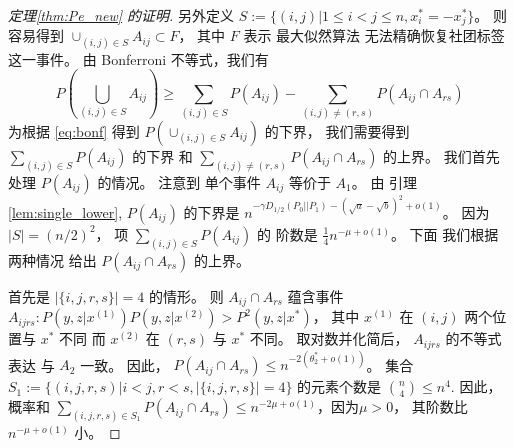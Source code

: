 \begin{proof}[定理\ref{thm:Pe_new} 的证明]
另外定义 $S:=\{(i,j)| 1\leq i < j\leq n,
x_i^*=-x_j^*
\}$。
则容易得到 $\cup_{(i,j) \in S} A_{ij} \subset F$，
其中 $F$ 表示 最大似然算法 无法精确恢复社团标签
这一事件。
由 Bonferroni 不等式，我们有
\begin{equation}\label{eq:bonf}
	P(\bigcup_{(i,j)\in S} A_{ij}) \geq
	\sum_{(i,j)\in S} P(A_{ij})
	- \sum_{(i,j) \neq (r,s)} P(A_{ij} \cap A_{rs})		
\end{equation}
为根据 \eqref{eq:bonf}
得到
$P(\cup_{(i,j)\in S} A_{ij})$
的下界，
我们需要得到 $\sum_{(i,j)\in S} P(A_{ij})$
的下界 和
$\sum_{(i,j) \neq (r,s)} P(A_{ij} \cap A_{rs})$
的上界。
我们首先 处理 $P(A_{ij})$ 的情况。
注意到 单个事件 $A_{ij}$
等价于 $A_1$。
由 引理\ref{lem:single_lower},
$P(A_{ij})$ 的下界是
$n^{-\gamma D_{1/2}(P_0 || P_1)-(\sqrt{a} - \sqrt{b})^2 +o(1)}$。
因为
$|S|=(n/2)^2$，
项 $\sum_{(i,j) \in S} P(A_{ij})$ 的 阶数是 
$\frac{1}{4}n^{-\mu+o(1)}$。
下面 我们根据两种情况 给出 $P(A_{ij} \cap A_{rs})$ 的上界。

首先是  $|\{i,j,r,s\}|=4$
的情形。 则 $A_{ij} \cap A_{rs}$ 蕴含事件
$A_{ijrs}: P(y,z|x^{(1)})P(y,z|x^{(2)}) > P^2(y,z|x^*)$，
其中 $x^{(1)}$ 在 $(i,j)$ 两个位置与 $x^*$ 不同
而 $x^{(2)}$ 在 $(r,s)$ 与 $x^*$
不同。
取对数并化简后，
$A_{ijrs}$ 的不等式表达
与 $A_2$ 一致。
因此， $P(A_{ij} \cap A_{rs}) \leq n^{-2(\theta^*_2 + o(1))} $。
集合 $S_1:=\{(i,j,r,s)| i<j, r<s, |\{i,j,r,s\}|=4\}$
的元素个数是 $\binom{n}{4} \leq n^4$.
因此，概率和
$\sum_{(i,j,r,s) \in S_1} P(A_{ij} \cap A_{rs})
\leq n^{-2\mu +o(1)}$，因为$\mu > 0$，
其阶数比 $n^{-\mu+o(1)}$ 小。


\end{proof}
